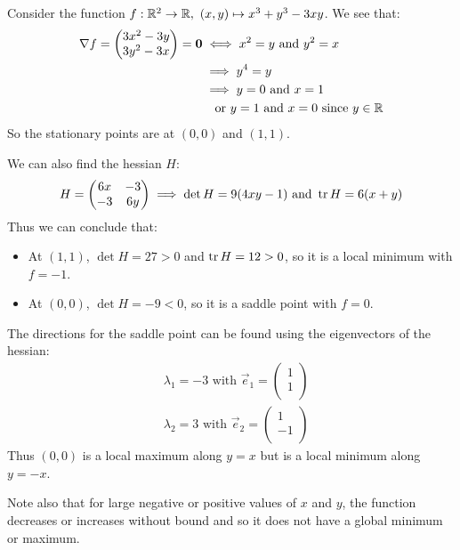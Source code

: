 \documentclass[../main.tex]{subfiles}
\begin{document}
\begin{example}
  Consider the function $f: \mathbb{R}^2 \to \mathbb{R},\ (x, y) \mapsto x^3 + y^3 - 3xy$.
  We see that:
  \begin{align*}
    \nabla f = \begin{pmatrix}
    3x^2 - 3y \\
    3y^2 - 3x \\
  \end{pmatrix} = \mathbf{\bm{0}} &\iff x^2 = y \text{ and } y^2 = x \\
  &\implies y^4 = y \\
  &\implies y = 0 \text{ and } x = 1 \\
  &\ \ \text{ or } y = 1 \text{ and } x = 0 \text{ since $y \in \mathbb{R}$}
  \end{align*}
  So the stationary points are at $(0, 0)$ and $(1, 1)$.

  We can also find the hessian $H$:
  \[
    H = \begin{pmatrix}
    6x & -3 \\
    -3 & 6y \\
    \end{pmatrix} \implies \det H = 9(4xy - 1) \text{ and } \operatorname{tr} H = 6(x + y)
  \]
  Thus we can conclude that:
  \begin{itemize}
    \item At $(1, 1)$, $\det H = 27 > 0$ and $\operatorname{tr} H = 12 > 0$, so it is a local minimum with $f = - 1$.
    \item At $(0, 0)$, $\det H = -9 < 0$, so it is a saddle point with $f = 0$.
  \end{itemize}
  The directions for the saddle point can be found using the eigenvectors of the hessian:
  \begin{align*}
    &\lambda_1 = - 3 \text{ with } \vec{e}_1 = \begin{pmatrix}
    1 \\
    1 \\
    \end{pmatrix} \\
    &\lambda_2 = 3 \text{ with } \vec{e}_2 = \begin{pmatrix}
    1 \\
    -1 \\
    \end{pmatrix}
  \end{align*}
  Thus $(0, 0)$ is a local maximum along $y = x$ but is a local minimum along $y = -x$.

  Note also that for large negative or positive values of $x$ and $y$, the function decreases or increases without bound and so it does not have a global minimum or maximum.
\end{example}
\end{document}
